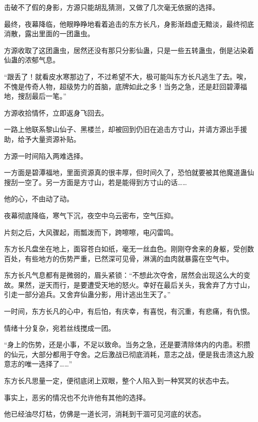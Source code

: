 
\begin{this_body}



击破不了假的身影，方源只能胡乱猜测，又做了几次毫无依据的选择。

最终，夜幕降临，他眼睁睁地看着追击的东方长凡，身影渐趋虚无黯淡，最终彻底消散，露出里面的一团蛊虫。

方源收取了这团蛊虫，居然还没有那只分影仙蛊，只是一些五转蛊虫，倒是沾染着仙蛊的浓郁气息。

“跟丢了！就看皮水寒那边了，不过希望不大，极可能叫东方长凡逃生了去。唉，不愧是传奇人物，超级势力的首脑，底牌如此之多！当务之急，还是赶回碧潭福地，搜刮最后一笔。”

方源收拾情怀，立即返身飞回去。

一路上他联系黎山仙子、黑楼兰，却被回到仍旧在追击方寸山，并请方源出手援助，给予大量资源补贴。

方源一时间陷入两难选择。

一方面是碧潭福地，里面资源真的很丰厚，但时间久了，恐怕就要被其他魔道蛊仙搜刮一空了。另一方面是方寸山，若是能得到方寸山的话……

他的心，不由动了动。

夜幕彻底降临，寒气下沉，夜空中乌云密布，空气压抑。

片刻之后，大风骤起，雨瓢泼而下，跨嚓嚓，电闪雷鸣。

东方长凡盘坐在地上，面容苍白如纸，毫无一丝血色。刚刚夺舍来的身躯，受创数百处，有些地方的伤势严重，已然深可见骨，淋漓的血肉就暴露在空气中。

东方长凡气息都有是微弱的，眉头紧锁：“不想此次夺舍，居然会出现这么大的变故。果然，逆天而行，是要遭受天地的怒火。幸好在最后关头，我舍弃了方寸山，引走一部分追兵。又舍弃仙蛊分影，用计逃出生天了。”

一时间，东方长凡的心中，有后怕，有庆幸，有喜悦，有沉重，有悲痛，有仇恨。

情绪十分复杂，宛若丝线搅成一团。

“身上的伤势，还是小事，不足以致命。当务之急，还是要清除体内的内患。积攒的仙元，大部分都用于夺舍。之后激战已彻底消耗，意志之战，便是我击溃这九股意志的唯一选择了……”

东方长凡思量一定，便彻底闭上双眼，整个人陷入到一种冥冥的状态中去。

事实上，恶劣的情况也不允许他有其他的选择。

他已经油尽灯枯，仿佛是一道长河，消耗到干涸可见河底的状态。


\end{this_body}

